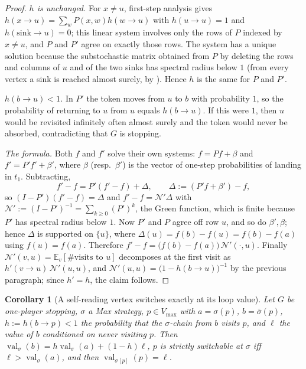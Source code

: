 \documentclass[11pt]{article}
\theoremstyle{plain}
\newtheorem{corollary}[theorem]{Corollary}
\theoremstyle{definition}
\DeclareMathOperator{\val}{val}
\newcommand{\Vmax}{V_{\max}}
\begin{document}
\begin{proof}
\emph{$h$ is unchanged.} For $x\ne u$, first-step analysis gives
$h(x\to u)=\sum_w P(x,w)h(w\to u)$ with $h(u\to u)=1$ and
$h(\text{sink}\to u)=0$; this linear system involves only the rows of $P$
indexed by $x\ne u$, and $P$ and $P'$ agree on exactly those rows. The
system has a unique solution because the substochastic matrix obtained
from $P$ by deleting the rows and columns of $u$ and of the two sinks has
spectral radius below $1$
(from every vertex a sink is reached almost surely, by
). Hence $h$ is the same for $P$ and $P'$.

\emph{$h(b\to u)<1$.} In $P'$ the token moves from $u$ to $b$ with
probability $1$, so the probability of returning to $u$ from $u$ equals
$h(b\to u)$. If this were $1$, then $u$ would be revisited infinitely
often almost surely and the token would never be absorbed, contradicting
that $G$ is stopping.

\emph{The formula.} Both $f$ and $f'$ solve their own systems:
$f=Pf+\beta$ and $f'=P'f'+\beta'$, where $\beta$ (resp.\ $\beta'$) is the
vector of one-step probabilities of landing in $t_1$. Subtracting,
\[
  f'-f=P'(f'-f)+\Delta,\qquad \Delta:=(P'f+\beta')-f ,
\]
so $(I-P')(f'-f)=\Delta$ and $f'-f=\mathcal{N}'\Delta$ with
$\mathcal{N}':=(I-P')^{-1}=\sum_{k\ge0}(P')^{k}$, the Green function,
which is finite because $P'$ has spectral radius below $1$. Now $P'$ and
$P$ agree off row $u$, and so do $\beta',\beta$; hence $\Delta$ is
supported on $\{u\}$, where
$\Delta(u)=f(b)-f(u)=f(b)-f(a)$ using $f(u)=f(a)$. Therefore
$f'-f=\bigl(f(b)-f(a)\bigr)\,\mathcal{N}'(\cdot,u)$. Finally
$\mathcal{N}'(v,u)=\mathbb{E}_v[\#\text{visits to }u]$ decomposes at the
first visit as $h'(v\to u)\,\mathcal{N}'(u,u)$, and
$\mathcal{N}'(u,u)=\bigl(1-h(b\to u)\bigr)^{-1}$ by the previous
paragraph; since $h'=h$, the claim follows.
\end{proof}
\begin{corollary}[A self-reading vertex switches exactly at its loop value]\label{cor:selfread}
Let $G$ be one-player stopping, $\sigma$ a Max strategy, $p\in\Vmax$ with
$a=\sigma(p)$, $b=\bar\sigma(p)$, $h:=h(b\to p)<1$ the probability that
the $\sigma$-chain from $b$ visits $p$, and $\ell$ the value of $b$
conditioned on never visiting $p$. Then
$\val_\sigma(b)=h\val_\sigma(a)+(1-h)\ell$, $p$ is strictly switchable
at $\sigma$ iff $\ell>\val_\sigma(a)$, and then $\val_{\sigma[p]}(p)=\ell$.
\end{corollary}
\end{document}
